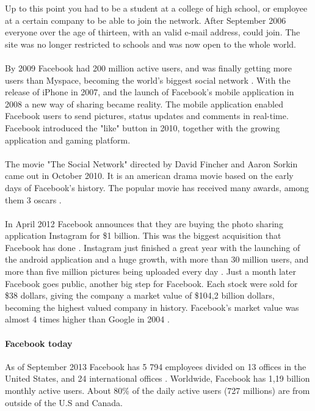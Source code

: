 Up to this point you had to be a student at a college of high school, or employee at a certain company to be able to join the network. After September 2006 everyone over the age of thirteen, with an valid e-mail address, could join. The site was no longer restricted to schools and was now open to the whole world. 

\paragraph{}
By 2009 Facebook had 200 million active users, and was finally getting more users than Myspace, becoming the world's biggest social network \cite{FacebookStoryInceptionToIsp}. With the release of iPhone in 2007, and the launch of Facebook's mobile application in 2008 a new way of sharing became reality. The mobile application enabled Facebook users to send pictures, status updates and comments in real-time. Facebook introduced the "like" button in 2010, together with the growing application and gaming platform. 

\paragraph{}
The movie "The Social Network" directed by David Fincher and Aaron Sorkin came out in October 2010. It is an american drama movie based on the early days of Facebook's history. The popular movie has received many awards, among them 3 oscars \cite{TheSocialNetwork}. 

\paragraph{}
In April 2012 Facebook announces that they are buying the photo sharing application Instagram for \$1 billion. This was the biggest acquisition that Facebook has done \cite{FacebookInstragram}. Instagram just finished a great year with the launching of the android application and a huge growth, with more than 30 million users, and more than five million pictures being uploaded every day \cite{BBCFacebookGrowth}. 
Just a month later Facebook goes public, another big step for Facebook. Each stock were sold for \$38 dollars, giving the company a market value of \$104,2 billion dollars, becoming the highest valued company in history. Facebook's market value was almost 4 times higher than Google in 2004 \cite{EvolutionOfFacebook}. 
  
\paragraph{Facebook today}
As of September 2013 Facebook has 5 794 employees divided on 13 offices in the United States, and 24 international offices \cite{keyFacts}. Worldwide, Facebook has 1,19 billion monthly active users. About 80\% of the daily active users (727 millions) are from outside of the U.S and Canada.

